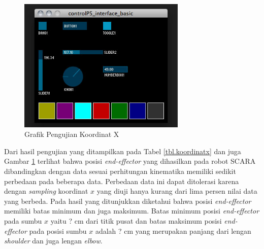 	\begin{figure}[H]
	\centering
	\includegraphics[width=8cm]{gambar/controlp5.jpg}
	\caption{Grafik Pengujian Koordinat X}
	\label{pic.koordinatx}
\end{figure}

Dari hasil pengujian yang ditampilkan pada Tabel \ref{tbl.koordinatx} dan juga Gambar \ref{pic.koordinatx} terlihat bahwa posisi \textit{end-effector} yang dihasilkan pada robot SCARA dibandingkan dengan data sesuai perhitungan kinematika memiliki sedikit perbedaan pada beberapa data. Perbedaan data ini dapat ditolerasi karena dengan \textit{sampling} koordinat $x$ yang diuji hanya kurang dari lima persen nilai data yang berbeda. Pada hasil yang ditunjukkan diketahui bahwa posisi \textit{end-effector} memiliki batas minimum dan juga maksimum. Batas minimum posisi \textit{end-effector} pada sumbu $x$ yaitu ? cm dari titik pusat dan batas maksimum posisi \textit{end-effector} pada posisi sumbu $x$ adalah ? cm yang merupakan panjang dari lengan \textit{shoulder} dan juga lengan \textit{elbow}. 

